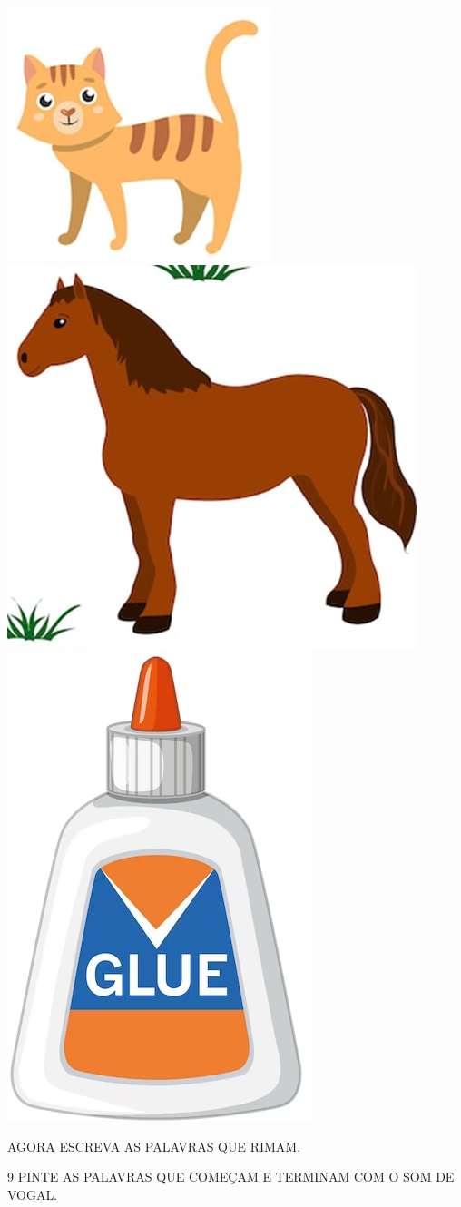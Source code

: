 \includegraphics[width=.25\textwidth]{media/image34.png}
\includegraphics[width=.25\textwidth]{media/image35.png}
\includegraphics[width=.15\textwidth]{media/image36.png}



\pagebreak
AGORA ESCREVA AS PALAVRAS QUE RIMAM.



\num{9} PINTE AS PALAVRAS QUE COMEÇAM E TERMINAM COM O SOM DE VOGAL.\bigskip

